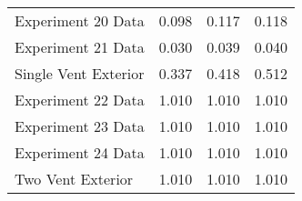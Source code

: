\begin{tabular}{lrrr}
Experiment 20 Data   &            0.098 &            0.117 &      0.118 \\
Experiment 21 Data   &            0.030 &            0.039 &      0.040 \\
Single Vent Exterior &            0.337 &            0.418 &      0.512 \\
Experiment 22 Data   &            1.010 &            1.010 &      1.010 \\
Experiment 23 Data   &            1.010 &            1.010 &      1.010 \\
Experiment 24 Data   &            1.010 &            1.010 &      1.010 \\
Two Vent Exterior    &            1.010 &            1.010 &      1.010 \\
\bottomrule
\end{tabular}
